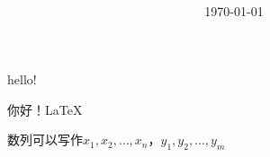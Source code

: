 \documentclass{article}
\title{\heiti \myArticleName\\ [2ex] \begin{large} \myHomeworkNumber \end{large}}
\author{\kaishu \myName \myNumber}
\date{\today}
\newcommand*{\myseries}[2][n]{\ensuremath{#2_1,#2_2,\dots,#2_#1}}
\begin{document}
\maketitle

  hello!

  你好！\LaTeX

  \newpage

  数列可以写作\myseries{x}，\myseries[m]{y}
\end{document}

